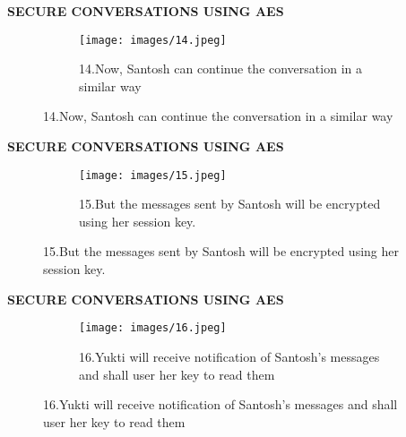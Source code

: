 \documentclass{beamer}
\begin{document}
\begin{frame}
\begin{tcolorbox}
\begin{center}
\textsc{\textbf{\textcolor{byzantium}{SECURE CONVERSATIONS USING AES}}}
\end{center}
\end{tcolorbox}
\begin{figure}
\centering
\begin{subfigure}{\textwidth}
  \centering
  \texttt{[image: images/14.jpeg]}
  \caption{14.Now, Santosh can continue the conversation in a similar way }
  \label{fig:sub1}
\end{subfigure}
\end{figure}
\end{frame}

\begin{frame}
\begin{tcolorbox}
\begin{center}
\textsc{\textbf{\textcolor{byzantium}{SECURE CONVERSATIONS USING AES}}}
\end{center}
\end{tcolorbox}
\begin{figure}
\centering
\begin{subfigure}{\textwidth}
  \centering
  \texttt{[image: images/15.jpeg]}
  \caption{15.But the messages sent by Santosh will be encrypted using her session key. }
  \label{fig:sub1}
\end{subfigure}
\end{figure}
\end{frame}

\begin{frame}
\begin{tcolorbox}
\begin{center}
\textsc{\textbf{\textcolor{byzantium}{SECURE CONVERSATIONS USING AES}}}
\end{center}
\end{tcolorbox}
\begin{figure}
\centering
\begin{subfigure}{\textwidth}
  \centering
  \texttt{[image: images/16.jpeg]}
  \caption{16.Yukti will receive notification of Santosh’s messages and shall user her key to read them }
  \label{fig:sub1}
\end{subfigure}
\end{figure}
\end{frame}
\end{document}
